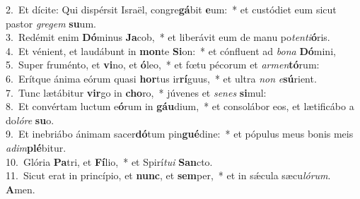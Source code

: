 {2.~}Et dícite: Qui dispérsit Israël, congre\textbf{gá}bit \textbf{e}um:~* et custódiet eum sicut pastor \textit{gre}\textit{gem} \textbf{su}um.\\
{3.~}Redémit enim \textbf{Dó}minus \textbf{Ja}cob,~* et liberávit eum de manu po\textit{ten}\textit{ti}\textbf{ó}ris.\\
{4.~}Et vénient, et laudábunt in \textbf{mon}te \textbf{Si}on:~* et cónfluent ad \textit{bo}\textit{na} \textbf{Dó}mini,\\
{5.~}Super fruménto, et \textbf{vi}no, et \textbf{ó}leo,~* et fœtu pécorum et \textit{ar}\textit{men}\textbf{tó}rum:\\
{6.~}Erítque ánima eórum quasi \textbf{hor}tus ir\textbf{rí}guus,~* et ultra \textit{non} \textit{e}\textbf{sú}rient.\\
{7.~}Tunc lætábitur \textbf{vir}go in \textbf{cho}ro,~* júvenes et \textit{se}\textit{nes} \textbf{si}mul:\\
{8.~}Et convértam luctum e\textbf{ó}rum in \textbf{gáu}dium,~* et consolábor eos, et lætificábo a do\textit{ló}\textit{re} \textbf{su}o.\\
{9.~}Et inebriábo ánimam sacer\textbf{dó}tum pin\textbf{gué}dine:~* et pópulus meus bonis meis \textit{a}\textit{dim}\textbf{plé}bitur.\\
{10.~}Glória \textbf{Pa}tri, et \textbf{Fí}lio,~* et Spirí\textit{tu}\textit{i} \textbf{San}cto.\\
{11.~}Sicut erat in princípio, et \textbf{nunc}, et \textbf{sem}per,~* et in sǽcula sæcu\textit{ló}\textit{rum}. \textbf{A}men.\\
